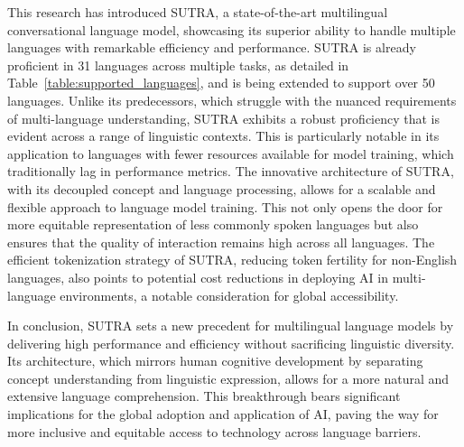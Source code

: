 \documentclass{article}
\begin{document}
This research has introduced SUTRA, a state-of-the-art multilingual conversational language model, showcasing its superior ability to handle multiple languages with remarkable efficiency and performance.
SUTRA is already proficient in 31 languages across multiple tasks, as detailed in Table~\ref{table:supported_languages}, and is being extended to support over 50 languages.
Unlike its predecessors, which struggle with the nuanced requirements of multi-language understanding, SUTRA exhibits a robust proficiency that is evident across a range of linguistic contexts. This is particularly notable in its application to languages with fewer resources available for model training, which traditionally lag in performance metrics. The innovative architecture of SUTRA, with its decoupled concept and language processing, allows for a scalable and flexible approach to language model training. This not only opens the door for more equitable representation of less commonly spoken languages but also ensures that the quality of interaction remains high across all languages. The efficient tokenization strategy of SUTRA, reducing token fertility for non-English languages, also points to potential cost reductions in deploying AI in multi-language environments, a notable consideration for global accessibility.

In conclusion, SUTRA sets a new precedent for multilingual language models by delivering high performance and efficiency without sacrificing linguistic diversity. Its architecture, which mirrors human cognitive development by separating concept understanding from linguistic expression, allows for a more natural and extensive language comprehension. This breakthrough bears significant implications for the global adoption and application of AI, paving the way for more inclusive and equitable access to technology across language barriers.
\end{document}
